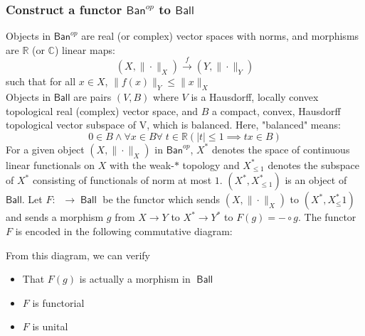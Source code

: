 \documentclass{article}
\newcommand{\R}{\mathbb{R}}
\newcommand{\C}{\mathbb{C}}
\DeclareMathOperator{\banop}{\textsf{Ban}^{op}}
\DeclareMathOperator{\ball}{\textsf{Ball}}
\begin{document}
\subsubsection{Construct a functor $\textsf{Ban}^{op}$ to $\textsf{Ball}$}
Objects in $\textsf{Ban}^{op}$ are real (or complex) vector spaces with norms, and morphisms are $\R$ (or $\C$) linear maps:
\begin{equation*}
	(X,\|\cdot\|_X)\xrightarrow{f}(Y,\|\cdot\|_Y)
\end{equation*}
such that for all $x\in X$, $\|f(x)\|_Y\leq\|x\|_X$\\
Objects in $\textsf{Ball}$ are pairs $(V,B)$ where $V$ is a Hausdorff, locally convex topological real (complex) vector space, and $B$ a compact, convex, Hausdorff topological vector subspace of V, which is balanced.  Here, "balanced" means:
\begin{equation*}
	0\in B\wedge\forall x\in B \forall\;t\in\R (|t|\leq 1\implies tx\in B)
\end{equation*}
For a given object $(X,\|\cdot\|_X)$ in $\textsf{Ban}^{op}$, $X^*$ denotes the space of continuous linear functionals on $X$ with the weak-$*$ topology and $X^*_{\leq1}$ denotes the subspace of $X^*$ consisting of functionals of norm at most $1$. 
$(X^*,X^*_{\leq1})$ is an object of $\textsf{Ball}$.
Let $F: \banop\rightarrow\ball$ be the functor which sends $(X,\|\cdot\|_X)$ to $(X^*,X^*_\leq{1})$ and sends a morphism $g$ from $X\rightarrow{Y}$ to $ X^*\rightarrow{Y^*}$ to $F(g) = -\circ{g}$.
The functor $F$ is encoded in the following commutative diagram:

\begin{center}
\end{center}
From this diagram, we can verify
\begin{itemize}
	\item That $F(g)$ is actually a morphism in $\ball$
	\item $F$ is functorial
	\item $F$ is unital
\end{itemize}
\end{document}
